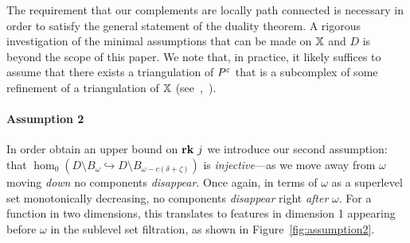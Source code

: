The requirement that our complements are locally path connected is necessary in order to satisfy the general statement of the duality theorem.
A rigorous investigation of the minimal assumptions that can be made on $\mathbb{X}$ and $D$ is beyond the scope of this paper.
We note that, in practice, it likely suffices to assume that there exists a triangulation of $P^\varepsilon$ that is a subcomplex of some refinement of a triangulation of $\mathbb{X}$ (see~\cite{cavanna2017when},~\cite{julian83alexander}).

\paragraph{Assumption 2}

In order obtain an upper bound on $\mathbf{rk}~j$ we introduce our second assumption: that $\hom_0(D\setminus B_\omega\hookrightarrow D\setminus B_{\omega-c(\delta+\zeta)})$ is \emph{injective}---as we move away from $\omega$ moving \emph{down} no components \emph{disappear}.
Once again, in terms of $\omega$ as a superlevel set monotonically decreasing, no components \emph{disappear} right \emph{after} $\omega$.
For a function in two dimensions, this translates to features in dimension 1 appearing before $\omega$ in the sublevel set filtration, as shown in Figure~\ref{fig:assumption2}.



